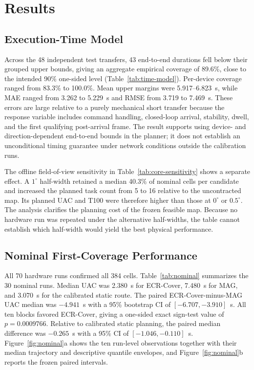 \section{Results}\label{sec:results}

\subsection{Execution-Time Model}

Across the 48 independent test transfers, 43 end-to-end durations fell below their grouped upper bounds, giving an aggregate empirical coverage of 89.6\%, close to the intended 90\% one-sided level (Table~\ref{tab:time-model}). Per-device coverage ranged from 83.3\% to 100.0\%. Mean upper margins were 5.917--6.823~s, while MAE ranged from 3.262 to 5.229~s and RMSE from 3.719 to 7.469~s. These errors are large relative to a purely mechanical short transfer because the response variable includes command handling, closed-loop arrival, stability, dwell, and the first qualifying post-arrival frame. The result supports using device- and direction-dependent end-to-end bounds in the planner; it does not establish an unconditional timing guarantee under network conditions outside the calibration runs.

The offline field-of-view sensitivity in Table~\ref{tab:core-sensitivity} shows a separate effect. A $1^\circ$ half-width retained a median 40.3\% of nominal cells per candidate and increased the planned task count from 5 to 16 relative to the uncontracted map. Its planned UAC and T100 were therefore higher than those at $0^\circ$ or $0.5^\circ$. The analysis clarifies the planning cost of the frozen feasible map. Because no hardware run was repeated under the alternative half-widths, the table cannot establish which half-width would yield the best physical performance.

\subsection{Nominal First-Coverage Performance}

All 70 hardware runs confirmed all 384 cells. Table~\ref{tab:nominal} summarizes the 30 nominal runs. Median UAC was 2.380~s for ECR-Cover, 7.480~s for MAG, and 3.070~s for the calibrated static route. The paired ECR-Cover-minus-MAG UAC median was $-4.941$~s with a 95\% bootstrap CI of $[-6.707,-3.910]$~s. All ten blocks favored ECR-Cover, giving a one-sided exact sign-test value of $p=0.0009766$. Relative to calibrated static planning, the paired median difference was $-0.265$~s with a 95\% CI of $[-1.046,-0.110]$~s. Figure~\ref{fig:nominal}a shows the ten run-level observations together with their median trajectory and descriptive quantile envelopes, and Figure~\ref{fig:nominal}b reports the frozen paired intervals.

